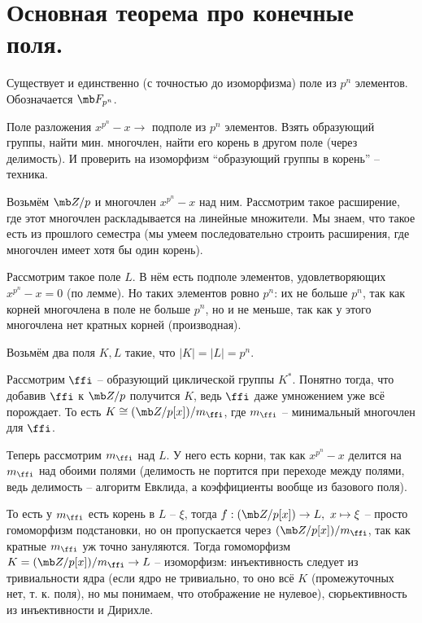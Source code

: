 \section{
 Основная теорема про конечные поля.
}

\thrm Существует и единственно (с точностью до изоморфизма) поле из $p^n$ элементов. Обозначается $\mb F_{p^n}$.

Поле разложения $x^{p^n} - x \to$ подполе из $p^n$ элементов. Взять образующий группы, найти мин. многочлен, найти его корень в другом поле (через делимость). И проверить на изоморфизм ``образующий группы в корень'' -- техника.


	
	Возьмём $\mb Z/p$ и многочлен $x^{p^n} - x$ над ним. Рассмотрим такое расширение, где этот многочлен раскладывается на линейные множители. Мы знаем, что такое есть из прошлого семестра (мы умеем последовательно строить расширения, где многочлен имеет хотя бы один корень).

	Рассмотрим такое поле $L$. В нём есть подполе элементов, удовлетворяющих $x^{p^n} - x = 0$ (по лемме). Но таких элементов ровно $p^n$: их не больше $p^n$, так как корней многочлена в поле не больше $p^n$, но и не меньше, так как у этого многочлена нет кратных корней (производная).



	Возьмём два поля $K, L$ такие, что $|K| = |L| = p^n$.

	Рассмотрим $\ffi$ -- образующий циклической группы $K^*$. Понятно тогда, что добавив $\ffi$ к $\mb Z/p$ получится $K$, ведь $\ffi$ даже умножением уже всё порождает. То есть $K \cong (\mb Z/p[x])/m_{\ffi}$, где $m_{\ffi}$ -- минимальный многочлен для $\ffi$.

	Теперь рассмотрим $m_{\ffi}$ над $L$. У него есть корни, так как $x^{p^n} - x$ делится на $m_{\ffi}$ над обоими полями (делимость не портится при переходе между полями, ведь делимость -- алгоритм Евклида, а коэффициенты вообще из базового поля). 

	То есть у $m_{\ffi}$ есть корень в $L$ -- $\xi$, тогда $f : (\mb Z/p[x]) \to L,\ x \mapsto \xi$ -- просто гомоморфизм подстановки, но он пропускается через $(\mb Z/p[x])/m_{\ffi}$, так как кратные $m_{\ffi}$ уж точно зануляются. Тогда гомоморфизм $K = (\mb Z/p[x])/m_{\ffi} \to L$ -- изоморфизм: инъективность следует из тривиальности ядра (если ядро не тривиально, то оно всё $K$ (промежуточных нет, т. к. поля), но мы понимаем, что отображение не нулевое), сюрьективность из инъективности и Дирихле.

\ethrm